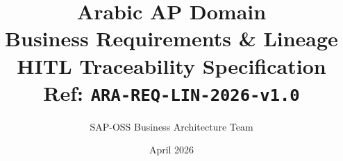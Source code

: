 \documentclass[11pt,a4paper,twoside]{report}
\begin{document}
\title{\Huge Arabic AP Domain \\
       \textbf{Business Requirements \& Lineage} \\
       \large HITL Traceability Specification \\
       \small Ref: \texttt{ARA-REQ-LIN-2026-v1.0}}
\author{SAP-OSS Business Architecture Team}
\date{April 2026}

\maketitle














\end{document}
